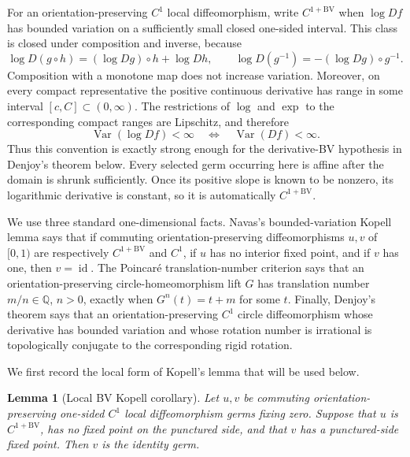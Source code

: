 \documentclass[11pt]{article}
\newtheorem{lemma}[theorem]{Lemma}
\theoremstyle{definition}
\theoremstyle{remark}
\newcommand{\id}{\operatorname{id}}
\newcommand{\Var}{\operatorname{Var}}
\begin{document}
For an orientation-preserving \(C^1\) local diffeomorphism, write
\(C^{1+\mathrm{BV}}\) when \(\log Df\) has bounded variation on a sufficiently
small closed one-sided interval.  This class is closed under composition and
inverse, because
\[
 \log D(g\circ h)=(\log Dg)\circ h+\log Dh,
 \qquad
 \log D(g^{-1})=-(\log Dg)\circ g^{-1}.
\]
Composition with a monotone map does not increase variation.  Moreover, on
every compact representative the positive continuous derivative has range in
some interval \([c,C]\subset(0,\infty)\).  The restrictions of \(\log\) and
\(\exp\) to the corresponding compact ranges are Lipschitz, and therefore
\begin{equation}\label{eq:pl-log-derivative-BV}
 \Var(\log Df)<\infty\quad\Longleftrightarrow\quad \Var(Df)<\infty.
\end{equation}
Thus this convention is exactly strong enough for the derivative-BV
hypothesis in Denjoy's theorem below.
Every selected germ occurring here is affine after the domain is
shrunk sufficiently.  Once its positive slope is known to be nonzero, its
logarithmic derivative is constant, so it is automatically
\(C^{1+\mathrm{BV}}\).

We use three standard one-dimensional facts.  Navas's
bounded-variation Kopell lemma \cite[Theorem 4.1.1]{Navas} says that if
commuting orientation-preserving diffeomorphisms $u,v$ of $[0,1)$ are
respectively $C^{1+\mathrm{BV}}$ and $C^1$, if $u$ has no interior fixed
point, and if $v$ has one, then $v=\id$.  The Poincar\'e translation-number
criterion \cite[Propositions 2.2.2 and 2.2.3]{Navas} says that an
orientation-preserving circle-homeomorphism lift $G$ has translation number
$m/n\in\mathbb Q$, $n>0$, exactly when $G^n(t)=t+m$ for some $t$.
Finally, Denjoy's theorem
\cite[Theorem 3.1.1]{Navas} says that an orientation-preserving $C^1$ circle
diffeomorphism whose derivative has bounded variation and whose rotation
number is irrational is topologically conjugate to the corresponding rigid
rotation.

We first record the local form of Kopell's lemma that will be used below.

\begin{lemma}[Local BV Kopell corollary]\label{lem:local-BV-Kopell}
Let \(u,v\) be commuting orientation-preserving one-sided \(C^1\) local
diffeomorphism germs fixing zero.  Suppose that \(u\) is
\(C^{1+\mathrm{BV}}\), has no fixed point on the punctured side, and that
\(v\) has a punctured-side fixed point.  Then \(v\) is the identity germ.
\end{lemma}
\end{document}
